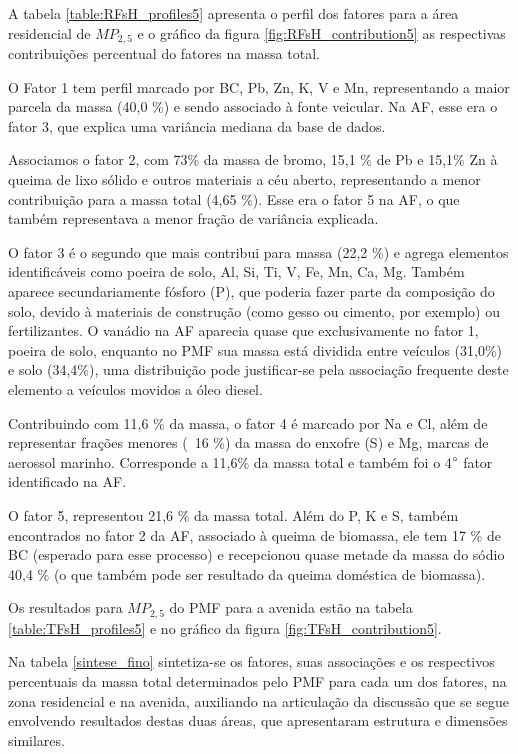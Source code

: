 A tabela \ref{table:RFsH_profiles5} apresenta o perfil dos fatores para a área
residencial de $MP_{2,5}$ e o gráfico da figura \ref{fig:RFsH_contribution5}
as respectivas contribuições percentual do fatores na massa total. 

O Fator 1 tem perfil marcado por BC, Pb, Zn, K, V e Mn, representando a maior 
parcela da massa (40,0 \%) e sendo associado à fonte veicular. 
Na AF, esse era o fator 3, que explica uma variância mediana da base de dados.

Associamos o fator 2, com 73\% da massa de bromo, 15,1 \% de Pb e 15,1\% Zn à 
queima de lixo sólido e outros materiais a céu aberto, representando a menor 
contribuição para a massa total (4,65 \%). Esse era o fator 5 na AF, o que 
também representava a menor fração de variância explicada.

O fator 3 é o segundo que mais contribui para massa (22,2 \%) e agrega elementos
identificáveis como poeira de solo, Al, Si, Ti, V, Fe, Mn, Ca, Mg. 
Também aparece secundariamente fósforo (P), que poderia fazer parte da 
composição do solo, devido à materiais de construção (como gesso ou cimento, 
por exemplo) ou fertilizantes. O vanádio na AF aparecia quase que exclusivamente
no fator 1, poeira de solo, enquanto no PMF sua massa está dividida entre 
veículos (31,0\%) e solo (34,4\%), uma distribuição pode justificar-se pela 
associação frequente deste elemento a veículos movidos a óleo diesel.

Contribuindo com 11,6 \% da massa, o fator 4 é marcado por Na e Cl, além de 
representar frações menores (~16 \%) da massa do enxofre (S) e Mg, 
marcas de aerossol marinho. Corresponde a 11,6\% da massa total e também foi o 
4$\degree$ fator identificado na AF.

O fator 5, representou  21,6 \% da massa total. Além do P, K e S, também 
encontrados no fator 2 da AF, associado à queima de biomassa, ele tem 
17 \% de BC (esperado para esse processo) e recepcionou quase metade da massa 
do sódio 40,4 \% (o que também pode ser resultado da queima doméstica de biomassa).

Os resultados para $MP_{2,5}$ do PMF para a avenida estão na tabela 
\ref{table:TFsH_profiles5} e no gráfico da figura \ref{fig:TFsH_contribution5}. 

Na tabela \ref{sintese_fino} sintetiza-se os fatores, suas associações e 
os respectivos percentuais da massa total determinados pelo PMF para cada um 
dos fatores, na zona residencial e na avenida, auxiliando na articulação da 
discussão que se segue envolvendo resultados destas duas áreas, 
que apresentaram estrutura e dimensões similares.

